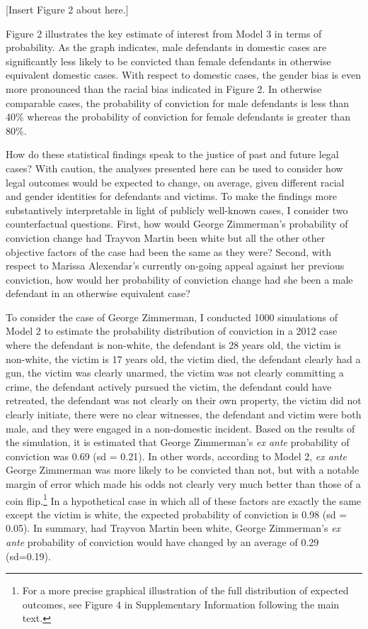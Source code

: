\documentclass[12pt,article]{article}
\begin{document}
{[}Insert Figure 2 about here.{]}

Figure 2 illustrates the key estimate of interest from Model 3 in terms
of probability. As the graph indicates, male defendants in domestic
cases are significantly less likely to be convicted than female
defendants in otherwise equivalent domestic cases. With respect to
domestic cases, the gender bias is even more pronounced than the racial
bias indicated in Figure 2. In otherwise comparable cases, the
probability of conviction for male defendants is less than 40\% whereas
the probability of conviction for female defendants is greater than
80\%.

How do these statistical findings speak to the justice of past and
future legal cases? With caution, the analyses presented here can be
used to consider how legal outcomes would be expected to change, on
average, given different racial and gender identities for defendants and
victims. To make the findings more substantively interpretable in light
of publicly well-known cases, I consider two counterfactual questions.
First, how would George Zimmerman's probability of conviction change had
Trayvon Martin been white but all the other other objective factors of
the case had been the same as they were? Second, with respect to Marissa
Alexendar's currently on-going appeal against her previous conviction,
how would her probability of conviction change had she been a male
defendant in an otherwise equivalent case?

To consider the case of George Zimmerman, I conducted 1000 simulations
of Model 2 to estimate the probability distribution of conviction in a
2012 case where the defendant is non-white, the defendant is 28 years
old, the victim is non-white, the victim is 17 years old, the victim
died, the defendant clearly had a gun, the victim was clearly unarmed,
the victim was not clearly committing a crime, the defendant actively
pursued the victim, the defendant could have retreated, the defendant
was not clearly on their own property, the victim did not clearly
initiate, there were no clear witnesses, the defendant and victim were
both male, and they were engaged in a non-domestic incident. Based on
the results of the simulation, it is estimated that George Zimmerman's
\emph{ex ante} probability of conviction was 0.69 (sd = 0.21). In other
words, according to Model 2, \emph{ex ante} George Zimmerman was more
likely to be convicted than not, but with a notable margin of error
which made his odds not clearly very much better than those of a coin
flip.\footnote{For a more precise graphical illustration of the full
  distribution of expected outcomes, see Figure 4 in Supplementary
  Information following the main text.} In a hypothetical case in which
all of these factors are exactly the same except the victim is white,
the expected probability of conviction is 0.98 (sd = 0.05). In summary,
had Trayvon Martin been white, George Zimmerman's \emph{ex ante}
probability of conviction would have changed by an average of 0.29
(sd=0.19).
\end{document}
